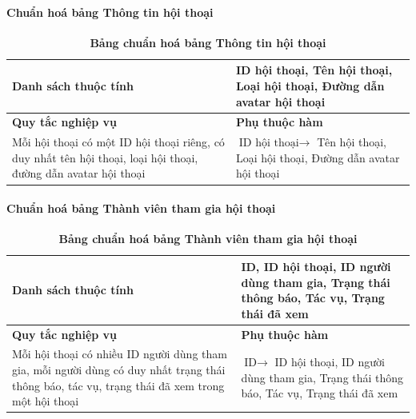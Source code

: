 \paragraph{Chuẩn hoá bảng Thông tin hội thoại}
\mbox{}
\begin{table}[H]
  \caption{\bfseries \fontsize{12pt}{0pt}\selectfont Bảng chuẩn hoá bảng Thông tin hội thoại}
  \centering
  \begin{tabularx}{0.9\textwidth}{|X|X|}
    \hline
    \textbf{Danh sách thuộc tính} & ID hội thoại, Tên hội thoại, 
    Loại hội thoại, Đường dẫn avatar hội thoại \\
    \hline
    \textbf{Quy tắc nghiệp vụ} & \textbf{Phụ thuộc hàm} \\
    \hline
    Mỗi hội thoại có một ID hội thoại riêng, có duy nhất tên hội thoại, 
    loại hội thoại, đường dẫn avatar hội thoại
    & \parbox[t]{\linewidth}{$\text{ID hội thoại} \rightarrow$ Tên hội thoại, 
    Loại hội thoại, Đường dẫn avatar hội thoại} \\
    \hline
     \\
     \\
    \hline
  \end{tabularx}
\end{table}

\paragraph{Chuẩn hoá bảng Thành viên tham gia hội thoại}
\mbox{}
\begin{table}[H]
  \caption{\bfseries \fontsize{12pt}{0pt}\selectfont Bảng chuẩn hoá bảng Thành viên tham gia hội thoại}
  \centering
  \begin{tabularx}{0.9\textwidth}{|X|X|}
    \hline
    \textbf{Danh sách thuộc tính} & ID, ID hội thoại, ID người dùng tham gia,
    Trạng thái thông báo, Tác vụ, Trạng thái đã xem \\
    \hline
    \textbf{Quy tắc nghiệp vụ} & \textbf{Phụ thuộc hàm} \\
    \hline
    Mỗi hội thoại có nhiều ID người dùng tham gia, mỗi người dùng có duy nhất trạng thái thông báo,
    tác vụ, trạng thái đã xem trong một hội thoại
    & \parbox[t]{\linewidth}{$\text{ID} \rightarrow$ ID hội thoại, ID người dùng tham gia,
    Trạng thái thông báo, Tác vụ, Trạng thái đã xem} \\
    \hline
     \\
     \\
    \hline
  \end{tabularx}
\end{table}


